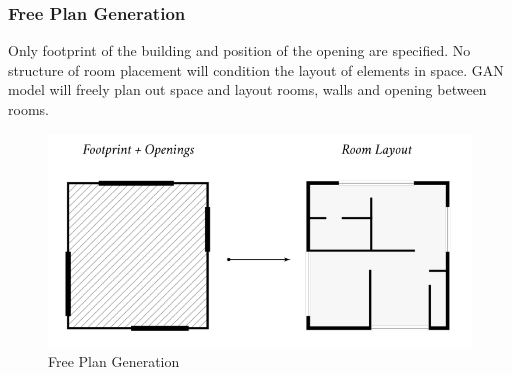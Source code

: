                         \subsubsection{Free Plan Generation}
                                Only footprint of the building and position of the opening are specified. No structure of room placement will condition the layout of elements in space. GAN model will freely plan out space and layout rooms, walls and opening between rooms.
                                \begin{figure}[h]
                                        \centering
                                        \includegraphics[width=1\textwidth]{img/chapter_6/freeplanGeneration.png}
                                        \caption{Free Plan Generation}
                                        \label{fig: Free Plan Generation}
                                \end{figure}
